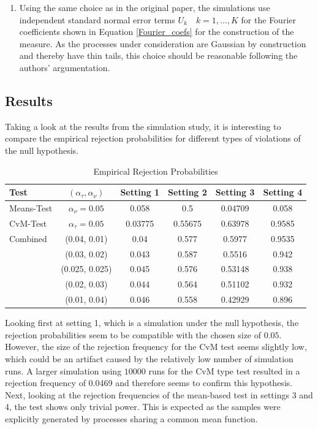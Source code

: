 \documentclass[12pt, a4paper]{article}
\theoremstyle{MAstyle} \newtheorem{assumption}{Assumption}[section]
\theoremstyle{MAstyle} \newtheorem{definition}{Definition}[section]
\theoremstyle{MAstyle} \newtheorem{theorem}{Theorem}[section]
\begin{document}
{{\begin{enumerate}
			\item Using the same choice as in the original paper, the simulations use independent standard normal error terms $U_k \quad k=1, \dots, K$ for the Fourier coefficients shown in Equation \ref{Fourier_coefs} for the construction of the measure. As the processes under consideration are Gaussian by construction and thereby have thin tails, this choice should be reasonable following the authors' argumentation.
		\end{enumerate}
			}
		}
		
		\subsection{Results}
		Taking a look at the results from the simulation study, it is interesting to compare the empirical rejection probabilities for different types of violations of the null hypothesis.
		
		\begin{table}[H]
			\centering
			\begin{tabular}{l|c|cccc}\toprule
				\textbf{Test}	&$\left(\alpha_{\tau}, \alpha_{\nu}\right) $ &\textbf{Setting 1} &\textbf{Setting 2}	&\textbf{Setting 3} &\textbf{Setting 4}\\
				\midrule
				Means-Test		&$\alpha_{\nu} = 0.05$	& 0.058		& 0.5  	 	& 0.04709	& 0.058 	\\
				CvM-Test 		&$\alpha_{\tau} = 0.05$	& 0.03775	& 0.55675  	& 0.63978 	& 0.9585	\\
				\midrule	
				Combined		& (0.04, 0.01)			& 0.04		& 0.577  	& 0.5977 	& 0.9535	\\
								& (0.03, 0.02)			& 0.043		& 0.587  	& 0.5516 	& 0.942 	\\
								& (0.025, 0.025)		& 0.045		& 0.576  	& 0.53148 	& 0.938		\\
								& (0.02, 0.03)			& 0.044		& 0.564  	& 0.51102 	& 0.932		\\
								& (0.01, 0.04)			& 0.046		& 0.558  	& 0.42929 	& 0.896		\\
				\bottomrule
			\end{tabular}
			\caption{Empirical Rejection Probabilities}
		\end{table}
		Looking first at setting 1, which is a simulation under the null hypothesis, the rejection probabilities seem to be compatible with the chosen size of $0.05$. However, the size of the rejection frequency for the CvM test seems slightly low, which could be an artifact caused by the relatively low number of simulation runs. A larger simulation using $10000$ runs for the CvM type test resulted in a rejection frequency of 0.0469 and therefore seems to confirm this hypothesis.
		Next, looking at the rejection frequencies of the mean-based test in settings 3 and 4, the test shows only trivial power. This is expected as the samples were explicitly generated by processes sharing a common mean function. 
		
\end{document}
